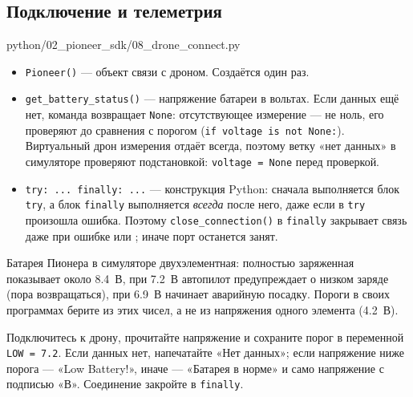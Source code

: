 \subsection{Подключение и телеметрия}
\label{sec:python-connect}

\begin{codefile}[python]{python/02_pioneer_sdk/08_drone_connect.py}
\end{codefile}

\begin{itemize}
    \item \verb|Pioneer()| --- объект связи с дроном. Создаётся один раз.
    \item \verb|get_battery_status()| --- напряжение батареи в вольтах. Если данных ещё нет, команда возвращает \verb|None|: отсутствующее измерение --- не ноль, его проверяют до сравнения с порогом (\verb|if voltage is not None:|). Виртуальный дрон измерения отдаёт всегда, поэтому ветку «нет данных» в симуляторе проверяют подстановкой: \verb|voltage = None| перед проверкой.
    \item \verb|try: ... finally: ...| --- конструкция Python: сначала выполняется блок \verb|try|, а блок \verb|finally| выполняется \emph{всегда} после него, даже если в \verb|try| произошла ошибка. Поэтому \verb|close_connection()| в \verb|finally| закрывает связь даже при ошибке или ; иначе порт останется занят.
\end{itemize}

\begin{infobox}
Батарея Пионера в симуляторе двухэлементная: полностью заряженная показывает около 8.4~В, при 7.2~В автопилот предупреждает о низком заряде (пора возвращаться), при 6.9~В начинает аварийную посадку. Пороги в своих программах берите из этих чисел, а не из напряжения одного элемента (4.2~В).
\end{infobox}

\begin{taskbox}[Диагностика]
Подключитесь к дрону, прочитайте напряжение и сохраните порог в переменной \verb|LOW = 7.2|. Если данных нет, напечатайте «Нет данных»; если напряжение ниже порога --- «Low Battery!», иначе --- «Батарея в норме» и само напряжение с подписью «В». Соединение закройте в \verb|finally|.
\end{taskbox}

